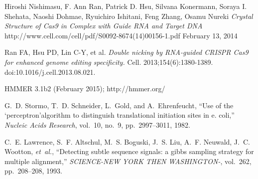 \documentclass[11pt, oneside]{article}
\begin{document}
\begin{thebibliography}{1}
Hiroshi Nishimasu, F. Ann Ran, Patrick D. Hsu, Silvana Konermann, Soraya I. Shehata, Naoshi Dohmae, Ryuichiro Ishitani, Feng Zhang, Osamu Nureki \emph{Crystal Structure of Cas9 in Complex with Guide RNA and Target DNA} http://www.cell.com/cell/pdf/S0092-8674(14)00156-1.pdf February 13, 2014

Ran FA, Hsu PD, Lin C-Y, et al. \emph{Double nicking by RNA-guided CRISPR Cas9 for enhanced genome editing specificity.} Cell. 2013;154(6):1380-1389. doi:10.1016/j.cell.2013.08.021.

HMMER 3.1b2 (February 2015); http://hmmer.org/

G.~D. Stormo, T.~D. Schneider, L.~Gold, and A.~Ehrenfeucht, ``Use of the
  ‘perceptron’algorithm to distinguish translational initiation sites in e.
  coli,'' {\em Nucleic Acids Research}, vol.~10, no.~9, pp.~2997--3011, 1982.

C.~E. Lawrence, S.~F. Altschul, M.~S. Boguski, J.~S. Liu, A.~F. Neuwald, J.~C.
  Wootton, {\em et~al.}, ``Detecting subtle sequence signals: a gibbs sampling
  strategy for multiple alignment,'' {\em SCIENCE-NEW YORK THEN WASHINGTON-},
  vol.~262, pp.~208--208, 1993.

\end{thebibliography}

% 
\end{document}
